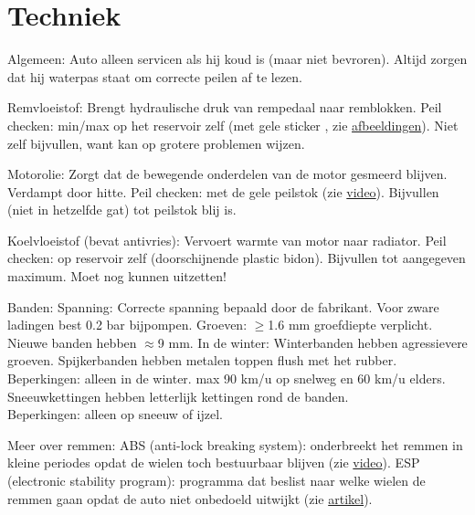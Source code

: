\section{Techniek}
\vspace{-0.25em}
\begin{outline}
\1 Algemeen:
	\2 Auto alleen servicen als hij koud is (maar niet bevroren).
	\2 Altijd zorgen dat hij waterpas staat om correcte peilen af te lezen.

\1 Remvloeistof:
	\2 Brengt hydraulische druk van rempedaal naar remblokken.
	\2 Peil checken: min/max op het reservoir zelf (met gele sticker \!, zie \href{https://www.holtsauto.com/prestone/news/understanding-brake-fluid-101/}{afbeeldingen}).
	\2 Niet zelf bijvullen, want kan op grotere problemen wijzen.

\1 Motorolie:
	\2 Zorgt dat de bewegende onderdelen van de motor gesmeerd blijven. Verdampt door hitte.
	\2 Peil checken: met de gele peilstok (zie \href{https://www.youtube.com/watch?v=t_vq6Z8PKZ8}{video}).	
	\2 Bijvullen (niet in hetzelfde gat) tot peilstok blij is.

\1 Koelvloeistof (bevat antivries):
	\2 Vervoert warmte van motor naar radiator.
	\2 Peil checken: op reservoir zelf (doorschijnende plastic bidon).
	\2 Bijvullen tot aangegeven maximum. Moet nog kunnen uitzetten!

\1 Banden:
	\2 Spanning:
		\3 Correcte spanning bepaald door de fabrikant.
		\3 Voor zware ladingen best 0.2 bar bijpompen.
	\2 Groeven:
		\3 $\geq$1.6 mm groefdiepte verplicht. Nieuwe banden hebben $\approx$9 mm.
		\3 In de winter:
			\4 Winterbanden hebben agressievere groeven.
			\4 Spijkerbanden hebben metalen toppen flush met het rubber. \\ Beperkingen: alleen in de winter. max 90 km/u op snelweg en 60 km/u elders.
			\4 Sneeuwkettingen hebben letterlijk kettingen rond de banden. \\ Beperkingen: alleen op sneeuw of ijzel.

\1 Meer over remmen:
	\2 ABS (anti-lock breaking system): onderbreekt het remmen in kleine periodes opdat de wielen toch bestuurbaar blijven (zie \href{https://www.youtube.com/watch?v=mlLYJW-yIIg}{video}).
	\2 ESP (electronic stability program): programma dat beslist naar welke wielen de remmen gaan opdat de auto niet onbedoeld uitwijkt (zie \href{https://www.carhelper.ch/blog/2018/01/23/abs-and-esp-what-is-the-difference/}{artikel}).
\end{outline}

